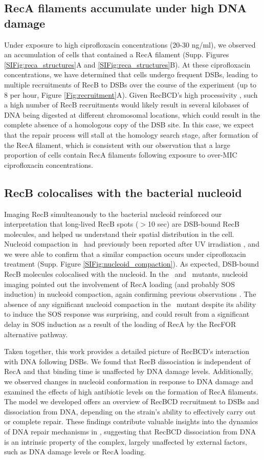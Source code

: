 \subsection*{RecA filaments accumulate under high DNA damage}
Under exposure to high ciprofloxacin concentrations (20-30 ng/ml), we observed an accumulation of cells that contained a RecA filament (Supp. Figures \ref{SIFig:reca_structures}A and \ref{SIFig:reca_structures}B). At these ciprofloxacin concentrations, we have determined that cells undergo frequent DSBs, leading to multiple recruitments of RecB to DSBs over the course of the experiment (up to 8 per hour, Figure \ref{Fig:recruitment}A). Given RecBCD's high processivity \cite{Wiktor2018}, such a high number of RecB recruitments would likely result in several kilobases of DNA being digested at different chromosomal locations, which could result in the complete absence of a homologous copy of the DSB site. In this case, we expect that the repair process will stall at the homology search stage, after formation of the RecA filament, which is consistent with our observation that a large proportion of cells contain RecA filaments following exposure to over-MIC ciprofloxacin concentrations.

\subsection*{RecB colocalises with the bacterial nucleoid}
Imaging RecB simulteanously to the bacterial nucleoid reinforced our interpretation that long-lived RecB spots ($>$10 sec) are DSB-bound RecB molecules, and helped us understand their spatial distribution in the cell. Nucleoid compaction in \ecoli\ had previously been reported after UV irradiation \cite{Odsbu2014}, and we were able to confirm that a similar compaction occurs under ciprofloxacin treatment (Supp. Figure \ref{SIFig:nucleoid_compaction}). As expected, DSB-bound RecB molecules colocalised with the nucleoid. In the \dreca\ and \geneteneighty\ mutants, nucleoid imaging pointed out the involvement of RecA loading (and probably SOS induction) in nucleoid compaction, again confirming previous observations \cite{Odsbu2014}. The absence of any significant nucleoid compaction in the \geneteneighty\ mutant despite its ability to induce the SOS response was surprising, and could result from a significant delay in SOS induction as a result of the loading of RecA by the RecFOR alternative pathway.

Taken together, this work provides a detailed picture of RecBCD's interaction with DNA following DSBs. We found that RecB dissociation is independent of RecA and that binding time is unaffected by DNA damage levels. Additionally, we observed changes in nucleoid conformation in response to DNA damage and examined the effects of high antibiotic levels on the formation of RecA filaments. The model we developed offers an overview of RecBCD recruitment to DSBs and dissociation from DNA, depending on the strain's ability to effectively carry out or complete repair.
These findings contribute valuable insights into the dynamics of DNA repair mechanisms in \ecoli, suggesting that RecBCD dissociation from DNA is an intrinsic property of the complex, largely unaffected by external factors, such as DNA damage levels or RecA loading.